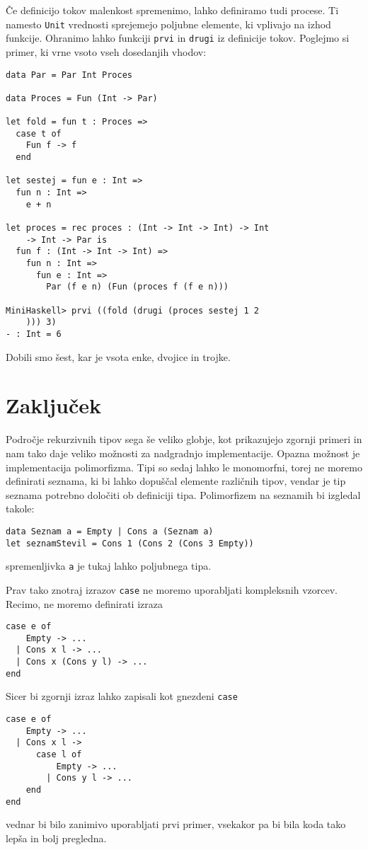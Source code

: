 \documentclass[12pt,a4paper,openany]{book}
\begin{document}
Če definicijo tokov malenkost spremenimo, lahko definiramo tudi procese. Ti namesto \lstinline{Unit} vrednosti sprejemejo poljubne elemente, ki 
vplivajo na izhod funkcije. Ohranimo lahko funkciji \lstinline{prvi} in \lstinline{drugi} iz definicije tokov. Poglejmo si primer, ki vrne vsoto 
vseh dosedanjih vhodov:
\begin{lstlisting}
data Par = Par Int Proces

data Proces = Fun (Int -> Par)

let fold = fun t : Proces =>
  case t of
    Fun f -> f
  end

let sestej = fun e : Int =>
  fun n : Int =>
    e + n

let proces = rec proces : (Int -> Int -> Int) -> Int 
    -> Int -> Par is
  fun f : (Int -> Int -> Int) =>
    fun n : Int =>
      fun e : Int =>
        Par (f e n) (Fun (proces f (f e n)))
  
MiniHaskell> prvi ((fold (drugi (proces sestej 1 2
    ))) 3)
- : Int = 6
\end{lstlisting}
Dobili smo šest, kar je vsota enke, dvojice in trojke.


\chapter{Zaključek}
Področje rekurzivnih tipov sega še veliko globje, kot prikazujejo zgornji primeri in nam tako daje veliko možnosti za nadgradnjo implementacije. 
Opazna možnost je implementacija polimorfizma. Tipi so sedaj lahko le monomorfni, torej ne moremo definirati seznama, ki bi lahko dopuščal elemente različnih tipov, 
vendar je tip seznama potrebno določiti ob definiciji tipa. Polimorfizem na seznamih bi izgledal takole:
\begin{lstlisting}
data Seznam a = Empty | Cons a (Seznam a)
let seznamStevil = Cons 1 (Cons 2 (Cons 3 Empty))
\end{lstlisting}
spremenljivka \lstinline{a} je tukaj lahko poljubnega tipa.

Prav tako znotraj izrazov \lstinline{case} ne moremo uporabljati kompleksnih vzorcev. Recimo, ne moremo definirati izraza
\begin{lstlisting}
case e of
    Empty -> ...
  | Cons x l -> ...
  | Cons x (Cons y l) -> ...
end
\end{lstlisting}
Sicer bi zgornji izraz lahko zapisali kot gnezdeni \lstinline{case}
\begin{lstlisting}
case e of
    Empty -> ...
  | Cons x l ->
      case l of
          Empty -> ...
        | Cons y l -> ...
    end
end
\end{lstlisting}
vednar bi bilo zanimivo uporabljati prvi primer, vsekakor pa bi bila koda tako lepša in bolj pregledna.
\end{document}
